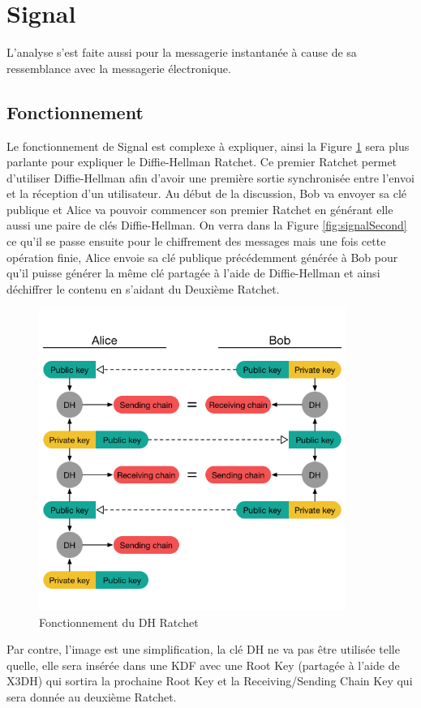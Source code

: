 \section{Signal}
L'analyse s'est faite aussi pour la messagerie instantanée à cause de sa ressemblance avec la messagerie électronique. 
\subsection{Fonctionnement}
Le fonctionnement de Signal est complexe à expliquer, ainsi la Figure \ref{fig:signal} sera plus parlante pour expliquer le Diffie-Hellman Ratchet. Ce premier Ratchet permet d'utiliser Diffie-Hellman afin d'avoir une première sortie synchronisée entre l'envoi et la réception d'un utilisateur. Au début de la discussion, Bob va envoyer sa clé publique et Alice va pouvoir commencer son premier Ratchet en générant elle aussi une paire de clés Diffie-Hellman. On verra dans la Figure \ref{fig:signalSecond} ce qu'il se passe ensuite pour le chiffrement des messages mais une fois cette opération finie, Alice envoie sa clé publique précédemment générée à Bob pour qu'il puisse générer la même clé partagée à l'aide de Diffie-Hellman et ainsi déchiffrer le contenu en s'aidant du Deuxième Ratchet.

\begin{figure}[h!]
	\centering
	\includegraphics[width=10cm]{images/signalFonctionnement.png}
	\caption{Fonctionnement du DH Ratchet~\cite{doubleratchet}}
	\label{fig:signal}
\end{figure}

Par contre, l'image est une simplification, la clé DH ne va pas être utilisée telle quelle, elle sera insérée dans une KDF avec une Root Key (partagée à l'aide de X3DH) qui sortira la prochaine Root Key et la Receiving/Sending Chain Key qui sera donnée au deuxième Ratchet.

